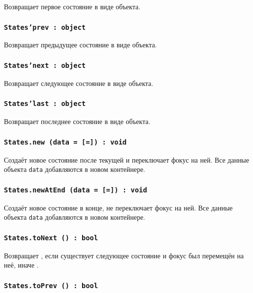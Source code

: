 Возвращает первое состояние в виде объекта.

\subsubsection{\texttt{States'prev : object}}

Возвращает предыдущее состояние в виде объекта.

\subsubsection{\texttt{States'next : object}}

Возвращает следующее состояние в виде объекта.

\subsubsection{\texttt{States'last : object}}

Возвращает последнее состояние в виде объекта.

\subsubsection{\texttt{States.new (data = [=]) : void}}

Создаёт новое состояние после текущей и переключает фокус на ней. Все данные объекта \texttt{data} добавляются в новом контейнере.

\subsubsection{\texttt{States.newAtEnd (data = [=]) : void}}

Создаёт новое состояние в конце, не переключает фокус на ней. Все данные объекта \texttt{data} добавляются в новом контейнере.

\subsubsection{\texttt{States.toNext () : bool}}

Возвращает \true, если существует следующее состояние и фокус был перемещён на неё, иначе \false.

\subsubsection{\texttt{States.toPrev () : bool}}

